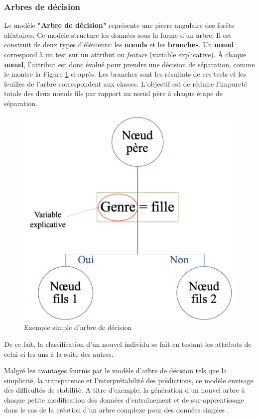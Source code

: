 \documentclass[11pt]{article}
\begin{document}
\begin{center}
\subsubsection{Arbres de décision}

Le modèle \textbf{"Arbre de décision"} représente une pierre angulaire des forêts aléatoires. Ce modèle structure les données sous la forme d'un arbre. Il est construit de deux types d'éléments: les \textbf{nœuds} et les \textbf{branches}. Un \textbf{nœud} correspond à un test sur un attribut ou \textit{feature} (variable explicative). À chaque \textbf{nœud}, l'attribut est donc évalué pour prendre une décision de séparation, comme le montre la Figure \ref{tree} ci-après. Les branches sont les résultats de ces tests et les feuilles de l'arbre correspondent aux classes. L'objectif est de réduire l'impureté totale des deux nœuds fils par rapport au nœud père à chaque étape de séparation.

\begin{figure}[hbt!]
    \centering
    \includegraphics[width = 7 cm]{./figures/tree.png}
    \caption{Exemple simple d'arbre de décision}
    \label{tree}
\end{figure}
\FloatBarrier

De ce fait, la classification d'un nouvel individu se fait en testant les attributs de celui-ci les uns à la suite des autres.\par

Malgré les avantages fournis par le modèle d'arbre de décision tels que la simplicité, la transparence et l’interprétabilité des prédictions, ce modèle envisage des difficultés de stabilité. A titre d'exemple, la génération d'un nouvel arbre à chaque petite modification des données d’entraînement et de sur-apprentissage dans le cas de la création d'un arbre complexe pour des données simples \cite{hands}.\par


\end{center}
\end{document}
